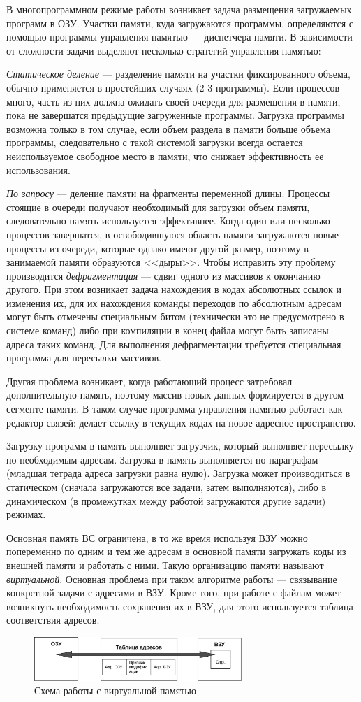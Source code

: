 \documentclass[unicode, 12pt, a4paper, oneside]{article}
\begin{document}
В многопрограммном режиме работы возникает задача размещения загружаемых программ в ОЗУ.  Участки памяти, куда загружаются программы, определяются с помощью программы управления памятью — диспетчера памяти. В зависимости от сложности задачи выделяют несколько стратегий управления памятью:

\textit{Статическое деление} --- разделение памяти на участки фиксированного объема, обычно применяется в простейших случаях (2-3 программы). Если процессов много, часть из них должна ожидать своей очереди для размещения в памяти, пока не завершатся предыдущие загруженные программы. Загрузка программы возможна только в том случае, если объем раздела в памяти больше объема программы, следовательно с такой системой загрузки всегда остается неиспользуемое свободное место в памяти, что снижает эффективность ее использования.

\textit{По запросу} --- деление памяти на фрагменты переменной длины. Процессы стоящие в очереди получают необходимый для загрузки объем памяти, следовательно память используется эффективнее. Когда один или несколько процессов завершатся, в освободившуюся область памяти загружаются новые процессы из очереди, которые однако имеют другой размер, поэтому в занимаемой памяти образуются <<дыры>>. Чтобы исправить эту проблему производится \textit{дефрагментация} --- сдвиг одного из массивов к окончанию другого. При этом возникает задача нахождения в кодах абсолютных ссылок и изменения их, для их нахождения команды переходов по абсолютным адресам могут быть отмечены специальным битом (технически это не предусмотрено в системе команд) либо при компиляции в конец файла могут быть записаны адреса таких команд. Для выполнения дефрагментации требуется специальная программа для пересылки массивов.

Другая проблема возникает, когда работающий процесс затребовал дополнительную память, поэтому массив новых данных формируется в другом сегменте памяти. В таком случае программа управления памятью работает как редактор связей: делает ссылку в текущих кодах на новое адресное пространство.

Загрузку программ в память выполняет загрузчик, который выполняет пересылку по необходимым адресам. Загрузка в память выполняется по параграфам (младшая тетрада адреса загрузки равна нулю). Загрузка может производиться в статическом (сначала загружаются все задачи, затем выполняются), либо в динамическом (в промежутках между работой загружаются другие задачи) режимах.

Основная память ВС ограничена, в то же время используя ВЗУ можно попеременно по одним и тем же адресам в основной памяти загружать коды из внешней памяти и работать с ними. Такую организацию памяти называют \textit{виртуальной}. Основная проблема при таком алгоритме работы — связывание конкретной задачи с адресами в ВЗУ. Кроме того, при работе с файлам может возникнуть необходимость сохранения их в ВЗУ, для этого используется таблица соответствия адресов.

\begin{figure}[H]
\centering
\includegraphics[width=0.7\textwidth]{160_virtual_memory.pdf}
\caption{Схема работы с виртуальной памятью}
\end{figure}
\end{document}
